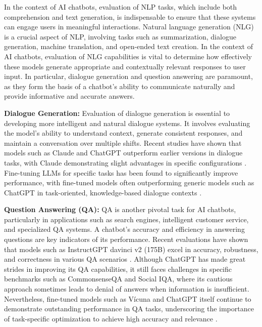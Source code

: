 In the context of AI chatbots, evaluation of NLP tasks, which include both comprehension and text generation, is indispensable to ensure that these systems can engage users in meaningful interactions. Natural language generation (NLG) is a crucial aspect of NLP, involving tasks such as summarization, dialogue generation, machine translation, and open-ended text creation. In the context of AI chatbots, evaluation of NLG capabilities is vital to determine how effectively these models generate appropriate and contextually relevant responses to user input. In particular, dialogue generation and question answering are paramount, as they form the basis of a chatbot's ability to communicate naturally and provide informative and accurate answers.

\textbf{Dialogue Generation:} Evaluation of dialogue generation is essential to developing more intelligent and natural dialogue systems. It involves evaluating the model's ability to understand context, generate consistent responses, and maintain a conversation over multiple shifts. Recent studies have shown that models such as Claude and ChatGPT outperform earlier versions in dialogue tasks, with Claude demonstrating slight advantages in specific configurations \cite{lin2023llm, qin2023chatgpt}. Fine-tuning LLMs for specific tasks has been found to significantly improve performance, with fine-tuned models often outperforming generic models such as ChatGPT in task-oriented, knowledge-based dialogue contexts \cite{bang2023multitask}.

\textbf{Question Answering (QA):} QA is another pivotal task for AI chatbots, particularly in applications such as search engines, intelligent customer service, and specialized QA systems. A chatbot's accuracy and efficiency in answering questions are key indicators of its performance. Recent evaluations have shown that models such as InstructGPT davinci v2 (175B) excel in accuracy, robustness, and correctness in various QA scenarios \cite{ouyang2022training, liang2022holistic}. Although ChatGPT has made great strides in improving its QA capabilities, it still faces challenges in specific benchmarks such as CommonsenseQA and Social IQA, where its cautious approach sometimes leads to denial of answers when information is insufficient. Nevertheless, fine-tuned models such as Vícuna and ChatGPT itself continue to demonstrate outstanding performance in QA tasks, underscoring the importance of task-specific optimization to achieve high accuracy and relevance \cite{bai2024benchmarking}.

